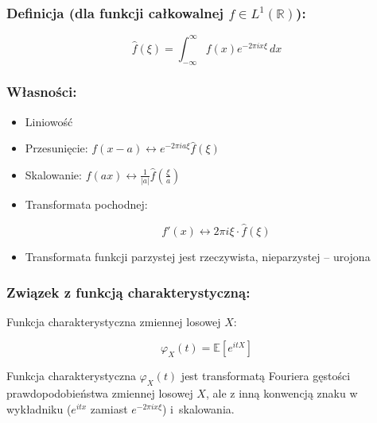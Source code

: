 \subsubsection*{Definicja (dla funkcji całkowalnej $f \in L^1(\mathbb{R})$):}

$$
\hat{f}(\xi) = \int_{-\infty}^{\infty} f(x) e^{-2\pi i x \xi} \, dx
$$

\subsubsection*{Własności:}
\begin{itemize}
    \item Liniowość
    \item Przesunięcie: $f(x - a) \leftrightarrow e^{-2\pi i a \xi} \hat{f}(\xi)$
    \item Skalowanie: $f(ax) \leftrightarrow \frac{1}{|a|} \hat{f}\left(\frac{\xi}{a}\right)$
    \item Transformata pochodnej:

    $$
    f'(x) \leftrightarrow 2\pi i \xi \cdot \hat{f}(\xi)
    $$
    \item Transformata funkcji parzystej jest rzeczywista, nieparzystej -- urojona
\end{itemize}

\subsubsection*{Związek z funkcją charakterystyczną:}
Funkcja charakterystyczna zmiennej losowej $X$:

$$
\varphi_X(t) = \mathbb{E}[e^{itX}]
$$

Funkcja charakterystyczna $\varphi_X(t)$ jest transformatą Fouriera gęstości prawdopodobieństwa zmiennej losowej $X$,
ale z inną konwencją znaku w wykładniku ($e^{itx}$ zamiast $e^{-2\pi i x \xi}$) i~skalowania.
